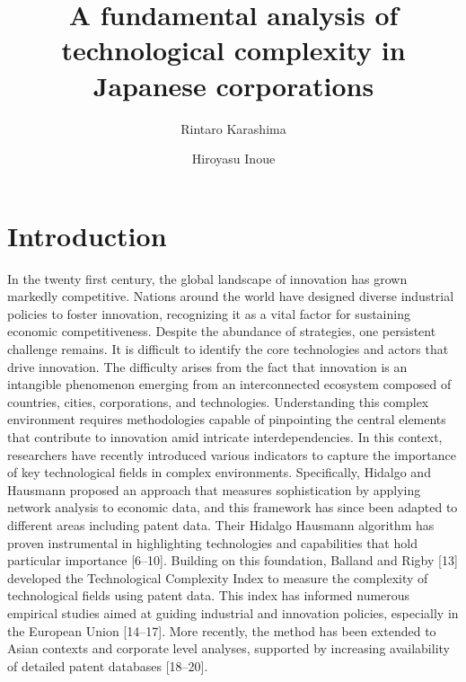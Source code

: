 \documentclass[fleqn,10pt]{wlscirep}
\title{A fundamental analysis of technological complexity in Japanese corporations}
\author[1,*]{Rintaro Karashima}
\author[1, 2]{Hiroyasu Inoue}
\affil[1]{University of Hyogo, Graduate School of Information Science, Kobe, 6500047, Japan}
\affil[2]{RIKEN, Center for Computational Science, Kobe, 6500047, Japan}
\affil[*]{rintaro.karashima@gmail.com}
\begin{document}
\flushbottom
\maketitle
%
%
\thispagestyle{empty}


\section*{Introduction}


In the twenty first century, the global landscape of innovation has grown markedly competitive. Nations around the world have designed diverse industrial policies to foster innovation, recognizing it as a vital factor for sustaining economic competitiveness. Despite the abundance of strategies, one persistent challenge remains. It is difficult to identify the core technologies and actors that drive innovation. The difficulty arises from the fact that innovation is an intangible phenomenon emerging from an interconnected ecosystem composed of countries, cities, corporations, and technologies. Understanding this complex environment requires methodologies capable of pinpointing the central elements that contribute to innovation amid intricate interdependencies.
In this context, researchers have recently introduced various indicators to capture the importance of key technological fields in complex environments. Specifically, Hidalgo and Hausmann proposed an approach that measures sophistication by applying network analysis to economic data, and this framework has since been adapted to different areas including patent data. Their Hidalgo Hausmann algorithm has proven instrumental in highlighting technologies and capabilities that hold particular importance [6–10]. Building on this foundation, Balland and Rigby [13] developed the Technological Complexity Index to measure the complexity of technological fields using patent data. This index has informed numerous empirical studies aimed at guiding industrial and innovation policies, especially in the European Union [14–17]. More recently, the method has been extended to Asian contexts and corporate level analyses, supported by increasing availability of detailed patent databases [18–20].
\end{document}
